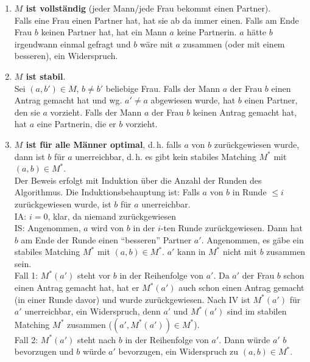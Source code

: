 \begin{Beweis}
    \begin{enumerate}
        \item
        \textbf{$M$ ist vollständig} (jeder Mann/jede Frau bekommt einen
        Partner). \\
        Falls eine Frau einen Partner hat, hat sie ab da immer einen.
        Falls am Ende Frau $b$ keinen Partner hat, hat ein Mann $a$ keine
        Partnerin.
        $a$ hätte $b$ irgendwann einmal gefragt und $b$ wäre mit $a$ zusammen
        (oder mit einem besseren), ein Widerspruch.

        \item
        \textbf{$M$ ist stabil}. \\
        Sei $(a, b') \in M$, $b \not= b'$ beliebige Frau.
        Falls der Mann $a$ der Frau $b$ einen Antrag gemacht hat und wg.
        $a' \not= a$ abgewiesen wurde, hat $b$ einen Partner, den sie $a$
        vorzieht.
        Falls der Mann $a$ der Frau $b$ keinen Antrag gemacht hat,
        hat $a$ eine Partnerin, die er $b$ vorzieht.

        \item
        \textbf{$M$ ist für alle Männer optimal}, d.\,h.
        falls $a$ von $b$ zurückgewiesen wurde, dann ist $b$ für $a$
        unerreichbar, d.\,h. es gibt kein stabiles Matching $M^\ast$
        mit $(a, b) \in M^\ast$. \\
        Der Beweis erfolgt mit Induktion über die Anzahl der Runden
        des Algorithmus. Die Induktionsbehauptung ist:
        Falls $a$ von $b$ in Runde $\le i$ zurückgewiesen wurde, ist $b$
        für $a$ unerreichbar. \\
        IA: $i = 0$, klar, da niemand zurückgewiesen \\
        IS: Angenommen, $a$ wird von $b$ in der $i$-ten Runde zurückgewiesen.
        Dann hat $b$ am Ende der Runde einen "`besseren"' Partner $a'$.
        Angenommen, es gäbe ein stabiles Matching $M^\ast$ mit
        $(a, b) \in M^\ast$.
        $a'$ kann in $M^\ast$ nicht mit $b$ zusammen sein. \\
        Fall 1: $M^\ast(a')$ steht vor $b$ in der Reihenfolge von $a'$.
        Da $a'$ der Frau $b$ schon einen Antrag gemacht hat, hat er
        $M^\ast(a')$ auch schon einen Antrag gemacht
        (in einer Runde davor) und wurde zurückgewiesen.
        Nach IV ist $M^\ast(a')$ für $a'$ unerreichbar, ein Widerspruch,
        denn $a'$ und $M^\ast(a')$ sind im stabilen Matching $M^\ast$
        zusammen ($(a', M^\ast(a')) \in M^\ast$). \\
        Fall 2: $M^\ast(a')$ steht nach $b$ in der Reihenfolge von $a'$.
        Dann würde $a'$ $b$ bevorzugen und $b$ würde $a'$ bevorzugen,
        ein Widerspruch zu $(a, b) \in M^\ast$.
    \end{enumerate}
\end{Beweis}

\pagebreak
